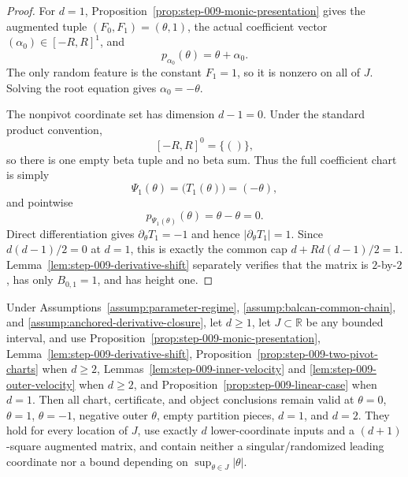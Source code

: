 \begin{proof}
For \(d=1\), Proposition~\ref{prop:step-009-monic-presentation} gives the augmented tuple \((F_0,F_1)=(\theta,1)\), the actual coefficient vector \((\alpha_0)\in[-R,R]^1\), and
\begin{equation}
\label{eq:appendix-display-300}
p_{\alpha_0}(\theta)=\theta+\alpha_0.
\end{equation}
The only random feature is the constant \(F_1=1\), so it is nonzero on all of \(J\). Solving the root equation gives \(\alpha_0=-\theta\).

The nonpivot coordinate set has dimension \(d-1=0\). Under the standard product convention,
\begin{equation}
\label{eq:appendix-display-301}
[-R,R]^0=\{()\},
\end{equation}
so there is one empty beta tuple and no beta sum. Thus the full coefficient chart is simply
\begin{equation}
\label{eq:appendix-display-302}
\Psi_1(\theta)=\bigl(T_1(\theta)\bigr)=(-\theta),
\end{equation}
and pointwise
\begin{equation}
\label{eq:appendix-display-303}
p_{\Psi_1(\theta)}(\theta)=\theta-\theta=0.
\end{equation}
Direct differentiation gives \(\partial_\theta T_1=-1\) and hence \(\lvert\partial_\theta T_1\rvert=1\). Since \(d(d-1)/2=0\) at \(d=1\), this is exactly the common cap \(d+Rd(d-1)/2=1\). Lemma~\ref{lem:step-009-derivative-shift} separately verifies that the matrix is \(2\)-by-\(2\), has only \(B_{0,1}=1\), and has height one.
\end{proof}

\begin{lemma} \label{lem:step-009-boundary-index-closure}
Under Assumptions~\ref{assump:parameter-regime}, \ref{assump:balcan-common-chain}, and \ref{assump:anchored-derivative-closure}, let \(d\geq1\), let \(J\subset\mathbb R\) be any bounded interval, and use Proposition~\ref{prop:step-009-monic-presentation}, Lemma~\ref{lem:step-009-derivative-shift}, Proposition~\ref{prop:step-009-two-pivot-charts} when \(d\geq2\), Lemmas~\ref{lem:step-009-inner-velocity} and \ref{lem:step-009-outer-velocity} when \(d\geq2\), and Proposition~\ref{prop:step-009-linear-case} when \(d=1\). Then all chart, certificate, and object conclusions remain valid at \(\theta=0\), \(\theta=1\), \(\theta=-1\), negative outer \(\theta\), empty partition pieces, \(d=1\), and \(d=2\). They hold for every location of \(J\), use exactly \(d\) lower-coordinate inputs and a \((d+1)\)-square augmented matrix, and contain neither a singular/randomized leading coordinate nor a bound depending on \(\sup_{\theta\in J}\lvert\theta\rvert\).


\end{lemma}


